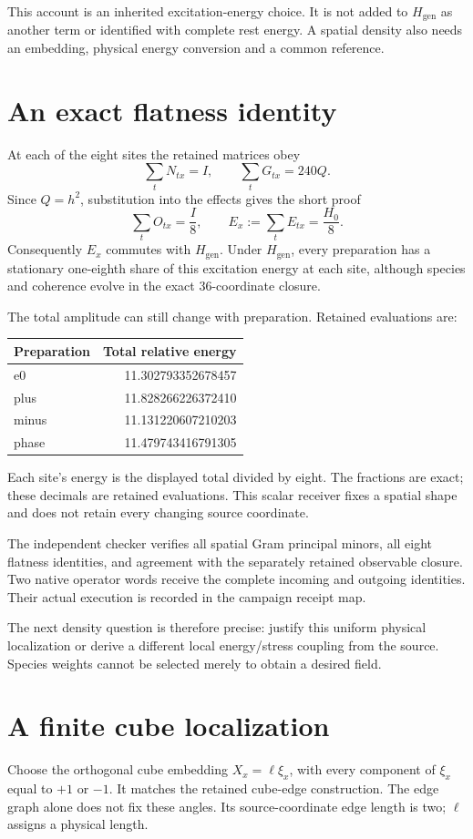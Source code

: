 \documentclass[10pt,twocolumn,letterpaper]{article}
\begin{document}
This account is an inherited excitation-energy choice. It is not added to $H_{\mathrm{gen}}$ as another term or identified with complete rest energy. A spatial density also needs an embedding, physical energy conversion and a common reference.

\section{An exact flatness identity}
At each of the eight sites the retained matrices obey
\[
\sum_tN_{tx}=I,\qquad\sum_tG_{tx}=240Q.
\]
Since $Q=h^2$, substitution into the effects gives the short proof
\[
\sum_tO_{tx}=\frac I8,\qquad E_x:=\sum_tE_{tx}=\frac{H_0}{8}.
\]
Consequently $E_x$ commutes with $H_{\mathrm{gen}}$. Under $H_{\mathrm{gen}}$, every preparation has a stationary one-eighth share of this excitation energy at each site, although species and coherence evolve in the exact 36-coordinate closure.

The total amplitude can still change with preparation. Retained evaluations are:
\begin{center}
\small
\begin{tabular}{@{}lr@{}}
\toprule
Preparation & Total relative energy\\
\midrule
e0 & 11.302793352678457\\
plus & 11.828266226372410\\
minus & 11.131220607210203\\
phase & 11.479743416791305\\
\bottomrule
\end{tabular}
\end{center}
Each site's energy is the displayed total divided by eight. The fractions are exact; these decimals are retained evaluations. This scalar receiver fixes a spatial shape and does not retain every changing source coordinate.

The independent checker verifies all spatial Gram principal minors, all eight flatness identities, and agreement with the separately retained observable closure. Two native operator words receive the complete incoming and outgoing identities. Their actual execution is recorded in the campaign receipt map.

The next density question is therefore precise: justify this uniform physical localization or derive a different local energy/stress coupling from the source. Species weights cannot be selected merely to obtain a desired field.


\section{A finite cube localization}
Choose the orthogonal cube embedding $X_x=\ell\xi_x$, with every component of $\xi_x$ equal to $+1$ or $-1$. It matches the retained cube-edge construction. The edge graph alone does not fix these angles. Its source-coordinate edge length is two; $\ell$ assigns a physical length.
\end{document}
